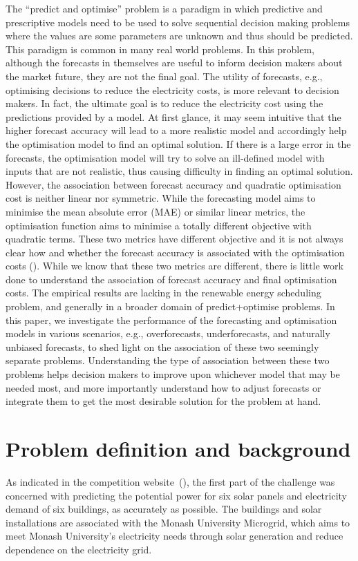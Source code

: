 \documentclass[conference]{IEEEtran}
\begin{document}
The ``predict and optimise'' problem is a paradigm in which predictive and prescriptive models need to be used to solve sequential decision making problems where the values are some parameters are unknown and thus should be predicted. This paradigm  is  common in many real world problems. In this problem, although the forecasts in themselves are useful to inform decision makers about the market future, they are not the final goal. The utility of forecasts, e.g., optimising decisions to reduce the electricity costs, is more relevant to decision makers. In fact, the ultimate goal is to reduce the electricity cost using the predictions provided by a model. At first glance, it may seem intuitive that the higher forecast accuracy will lead to a more realistic model and accordingly help the optimisation model to find an optimal solution. If there is a large error in the forecasts, the optimisation model will try to solve an ill-defined model with inputs that are not realistic, thus causing difficulty in finding an optimal solution. However, the association between forecast accuracy and quadratic optimisation cost is neither linear nor symmetric. While the forecasting model aims to minimise the mean absolute error (MAE) or similar linear metrics, the optimisation function aims to minimise a totally different objective with quadratic terms. These two metrics have different objective and it is not always clear how and whether the forecast accuracy is associated with the optimisation costs (\cite{Khabibrakhmanov}). While we know that these two metrics are different, there is little work done to understand the association of forecast accuracy and final optimisation costs. The empirical results are lacking in the renewable energy scheduling problem, and generally in a broader domain of predict+optimise problems. In this paper, we investigate the performance of the forecasting and optimisation models in various scenarios, e.g., overforecasts, underforecasts, and naturally unbiased forecasts,  to shed light on the association of these two seemingly separate problems. Understanding the type of association between these two problems helps decision makers to improve upon whichever model that may be needed most, and more importantly understand how to adjust forecasts or integrate them to get the most desirable solution for the problem at hand.


\section{Problem definition and background}
As indicated in the competition website~(\cite{comp}), the first part of the challenge was concerned with predicting the potential power for six solar panels and electricity demand of six buildings, as accurately as possible. The buildings and solar installations are associated with the Monash University Microgrid, which aims to meet Monash University's electricity needs through solar generation and reduce dependence on the electricity grid.
\end{document}

